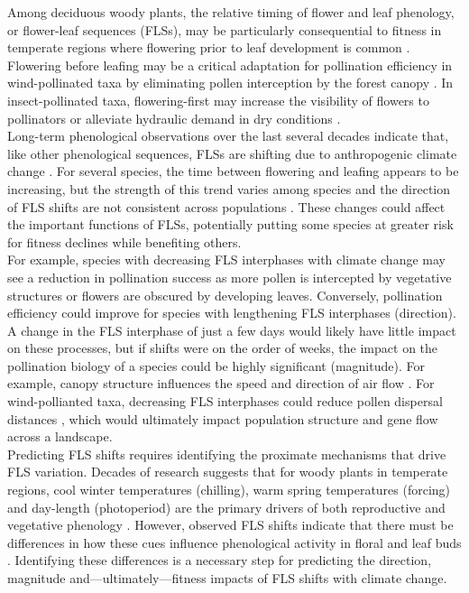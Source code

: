 \documentclass[11pt]{article}\usepackage[]{graphicx}\usepackage[]{color}
\begin{document}
\noindent Among deciduous woody plants, the relative timing of flower and leaf phenology, or flower-leaf sequences (FLSs), may be particularly consequential to fitness in temperate regions where flowering prior to leaf development is common \citep{Rathcke_1985,Gougherty2018}. Flowering before leafing may be a critical adaptation for pollination efficiency in wind-pollinated taxa by eliminating pollen interception by the forest canopy \citep{Whitehead1969}. In insect-pollinated taxa, flowering-first may increase the visibility of flowers to pollinators \citep{Janzen1967,Savage2019} or alleviate hydraulic demand in dry conditions \citep{Gougherty2018, Franklin2016}.\\

\noindent Long-term phenological observations over the last several decades indicate that, like other phenological sequences, FLSs are shifting due to anthropogenic climate change \citep{Buonaiuto2020}. For several species, the time between flowering and leafing appears to be increasing, but the strength of this trend varies among species and the direction of FLS shifts are not consistent across populations \citep{Buonaiuto2020}. These changes could affect the important functions of FLSs, potentially putting some species at greater risk for fitness declines while benefiting others.\\

\noindent For example, species with decreasing FLS interphases with climate change may see a reduction in pollination success as more pollen is intercepted by vegetative structures or flowers are obscured by developing leaves. Conversely, pollination efficiency could improve for species with lengthening FLS interphases (direction). A change in the FLS interphase of just a few days would likely have little impact on these processes, but if shifts were on the order of weeks, the impact on the pollination biology of a species could be highly significant (magnitude). For example, canopy structure influences the speed and direction of air flow \citep{Niklas1985, Jackson:1999aa}. For wind-pollianted taxa, decreasing FLS interphases could reduce pollen dispersal distances \citep{Milleron2012}, which would ultimately impact population structure and gene flow across a landscape.\\

\noindent Predicting FLS shifts requires identifying the proximate mechanisms that drive FLS variation. Decades of research suggests that for woody plants in temperate regions, cool winter temperatures (chilling), warm spring temperatures (forcing) and day-length (photoperiod) are the primary drivers of both reproductive and vegetative phenology \citep{Forrest2010,Flynn2018}. However, observed FLS shifts indicate that there must be differences in how these cues influence phenological activity in floral and leaf buds \citep{Buonaiuto2020}. Identifying these differences is a necessary step for predicting the direction, magnitude and---ultimately---fitness impacts of FLS shifts with climate change.\\ 
\end{document}
